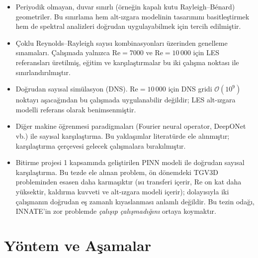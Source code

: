 \begin{itemize}
  \item Periyodik olmayan, duvar sınırlı (örneğin kapalı kutu Rayleigh--B\'enard) geometriler. Bu sınırlama hem alt-ızgara modelinin tasarımını basitleştirmek hem de spektral analizleri doğrudan uygulayabilmek için tercih edilmiştir.
  \item Çoklu Reynolds--Rayleigh sayısı kombinasyonları üzerinden genelleme sınamaları. Çalışmada yalnızca $\mathrm{Re}=7000$ ve $\mathrm{Re}=10\,000$ için LES referansları üretilmiş, eğitim ve karşılaştırmalar bu iki çalışma noktası ile sınırlandırılmıştır.
  \item Doğrudan sayısal simülasyon (DNS). $\mathrm{Re}=10\,000$ için DNS gridi $\mathcal{O}(10^{9})$ noktayı aşacağından bu çalışmada uygulanabilir değildir; LES alt-ızgara modelli referans olarak benimsenmiştir.
  \item Diğer makine öğrenmesi paradigmaları (Fourier neural operator, DeepONet vb.) ile sayısal karşılaştırma. Bu yaklaşımlar literatürde \cite{li_fno_2021, lu_deeponet_2021, lesnets_2024} ele alınmıştır; karşılaştırma çerçevesi gelecek çalışmalara bırakılmıştır.
  \item Bitirme projesi 1 kapsamında geliştirilen PINN modeli ile doğrudan sayısal karşılaştırma. Bu tezde ele alınan problem, ön dönemdeki TGV3D probleminden esasen daha karmaşıktır (ısı transferi içerir, $\mathrm{Re}$ on kat daha yüksektir, kaldırma kuvveti ve alt-ızgara modeli içerir); dolayısıyla iki çalışmanın doğrudan eş zamanlı kıyaslanması anlamlı değildir. Bu tezin odağı, INNATE'in zor problemde \emph{çalışıp çalışmadığını} ortaya koymaktır.
\end{itemize}

\section{Yöntem ve Aşamalar}

